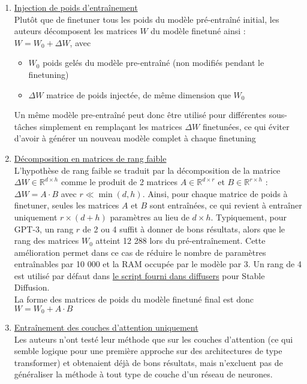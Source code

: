 \documentclass{article}
\begin{document}
\begin{enumerate}
    \vspace{-0.2cm}
    \item \underline{Injection de poids d'entraînement}\\
    Plutôt que de finetuner tous les poids du modèle pré-entraîné initial, les auteurs décomposent les matrices $W$ du modèle finetuné ainsi : $W  = W_0 + \Delta W$, avec 
    \begin{itemize}[noitemsep,topsep=0pt,parsep=0pt,partopsep=0pt]
        \vspace{-0.2cm}
        \item $W_0$ poids gelés du modèle pre-entraîné (non modifiés pendant le finetuning)
        \item $\Delta W$ matrice de poids injectée, de même dimension que $W_0$
    \end{itemize}
    Un même modèle pre-entraîné peut donc être utilisé pour différentes sous-tâches simplement en remplaçant les matrices $\Delta W$ finetunées, ce qui éviter d'avoir à générer un nouveau modèle complet à chaque finetuning
    \item \underline{Décomposition en matrices de rang faible}\\
    L'hypothèse de rang faible se traduit par la décomposition de la matrice $\Delta W \in \mathbb{R}^{d \times h}$ comme le produit de 2 matrices $A \in \mathbb{R}^{d \times r}$ et $B \in \mathbb{R}^{r \times h}$ : $\Delta W = A \cdot B$ avec $r \ll \min(d, h)$. Ainsi, pour chaque matrice de poids à finetuner, seules les matrices $A$ et $B$ sont entraînées, ce qui revient à entraîner uniquement $r \times (d+h)$ paramètres au lieu de $d \times h$. Typiquement, pour GPT-3, un rang $r$ de 2 ou 4 suffit à donner de bons résultats, alors que le rang des matrices $W_0$ atteint 12 288 lors du pré-entraînement. Cette amélioration permet dans ce cas de réduire le nombre de paramètres entraînables par 10 000 et la RAM occupée par le modèle par 3. Un rang de 4 est utilisé par défaut dans \href{https://github.com/huggingface/diffusers/blob/main/examples/text_to_image/train_text_to_image_lora.py}{le script fourni dans diffusers} pour Stable Diffusion.\\
    La forme des matrices de poids du modèle finetuné final est donc $W = W_0 + A \cdot B$
    \item \underline{Entraînement des couches d'attention uniquement}\\
    Les auteurs n'ont testé leur méthode que sur les couches d'attention (ce qui semble logique pour une première approche sur des architectures de type transformer) et obtenaient déjà de bons résultats, mais n'excluent pas de généraliser la méthode à tout type de couche d'un réseau de neurones.
\end{enumerate}
\end{document}
